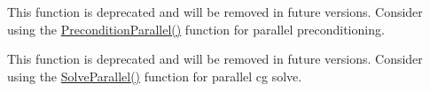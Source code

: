\begin{DoxyRefList}
\item[Member \mbox{\hyperlink{classSolverCG_ad8c4220fab79a6f34b8aa068e29d6511}{Solver\+CG\+::Precondition}} (double $\ast$p, double $\ast$t)]\label{deprecated__deprecated000007}%
%
This function is deprecated and will be removed in future versions. Consider using the \mbox{\hyperlink{classSolverCG_a123782d564c3527edb06d819814e31fc}{Precondition\+Parallel()}} function for parallel preconditioning. 
\item[Member \mbox{\hyperlink{classSolverCG_a912137e50d0887235b01d42327976441}{Solver\+CG\+::Solve}} (double $\ast$b, double $\ast$x, bool verbose)]\label{deprecated__deprecated000006}%
%
This function is deprecated and will be removed in future versions. Consider using the \mbox{\hyperlink{classSolverCG_a96403ae1ec87dbe1f963fea60631ecaa}{Solve\+Parallel()}} function for parallel cg solve.
\end{DoxyRefList}